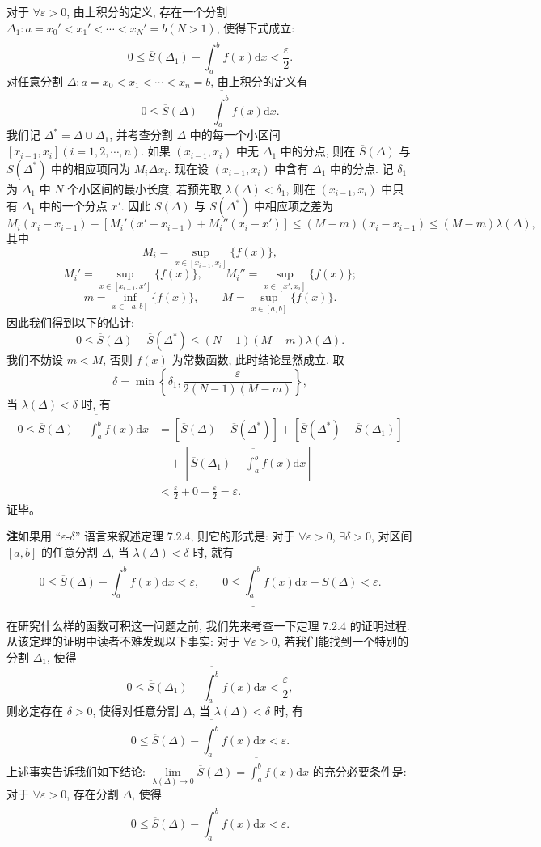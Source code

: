 \documentclass[UTF8, 12pt, fontset=fandol, oneside]{ctexart}
\begin{document}
对于 $\forall\varepsilon>0$, 由上积分的定义, 存在一个分割 $\Delta_1:a=x_0'<x_1'<\cdots<x_N'=b(N>1)$, 使得下式成立:
\[
  0\leq \overline S(\Delta_1)-\overline{\int_a^b} f(x)\mathrm dx<\frac{\varepsilon}{2}.
\]
对任意分割 $\Delta:a=x_0<x_1<\cdots<x_n=b$, 由上积分的定义有
\[
  0\leq \overline S(\Delta)-\overline{\int_a^b} f(x)\mathrm dx.
\]
我们记 $\Delta^*=\Delta\cup\Delta_1$, 并考查分割 $\Delta$ 中的每一个小区间 $[x_{i-1},x_i](i=1,2,\cdots,n)$. 如果 $(x_{i-1},x_i)$ 中无 $\Delta_1$ 中的分点, 则在 $\overline S(\Delta)$ 与 $\overline S(\Delta^*)$ 中的相应项同为 $M_i\Delta x_i$. 现在设 $(x_{i-1},x_i)$ 中含有 $\Delta_1$ 中的分点. 记 $\delta_1$ 为 $\Delta_1$ 中 $N$ 个小区间的最小长度, 若预先取 $\lambda(\Delta)<\delta_1$, 则在 $(x_{i-1},x_i)$ 中只有 $\Delta_1$ 中的一个分点 $x'$. 因此 $\overline S(\Delta)$ 与 $\overline S(\Delta^*)$ 中相应项之差为
\[
  M_i(x_i-x_{i-1})-[M_i'(x'-x_{i-1})+M_i''(x_i-x')]
  \leq (M-m)(x_i-x_{i-1})\leq (M-m)\lambda(\Delta),
\]
其中
\[
  M_i=\sup_{x\in[x_{i-1},x_i]}\{f(x)\},
\]
\[
  M_i'=\sup_{x\in[x_{i-1},x']}\{f(x)\},\qquad
  M_i''=\sup_{x\in[x',x_i]}\{f(x)\};
\]
\[
  m=\inf_{x\in[a,b]}\{f(x)\},\qquad M=\sup_{x\in[a,b]}\{f(x)\}.
\]
因此我们得到以下的估计:
\[
  0\leq \overline S(\Delta)-\overline S(\Delta^*)\leq (N-1)(M-m)\lambda(\Delta).
\]
我们不妨设 $m<M$, 否则 $f(x)$ 为常数函数, 此时结论显然成立. 取
\[
  \delta=\min\left\{\delta_1,\frac{\varepsilon}{2(N-1)(M-m)}\right\},
\]
当 $\lambda(\Delta)<\delta$ 时, 有
\[
\begin{aligned}
  0\leq \overline S(\Delta)-\overline{\int_a^b} f(x)\mathrm dx
  &=[\overline S(\Delta)-\overline S(\Delta^*)]+[\overline S(\Delta^*)-\overline S(\Delta_1)]\\
  &\quad+\left[\overline S(\Delta_1)-\overline{\int_a^b} f(x)\mathrm dx\right]\\
  &<\frac{\varepsilon}{2}+0+\frac{\varepsilon}{2}=\varepsilon.
\end{aligned}
\]
证毕。

\noindent\textbf{注}\quad 如果用 ``$\varepsilon$-$\delta$'' 语言来叙述定理 7.2.4, 则它的形式是: 对于 $\forall\varepsilon>0$, $\exists\delta>0$, 对区间 $[a,b]$ 的任意分割 $\Delta$, 当 $\lambda(\Delta)<\delta$ 时, 就有
\[
  0\leq \overline S(\Delta)-\overline{\int_a^b} f(x)\mathrm dx<\varepsilon,\qquad
  0\leq \underline{\int_a^b} f(x)\mathrm dx-\underline S(\Delta)<\varepsilon.
\]

在研究什么样的函数可积这一问题之前, 我们先来考查一下定理 7.2.4 的证明过程. 从该定理的证明中读者不难发现以下事实: 对于 $\forall\varepsilon>0$, 若我们能找到一个特别的分割 $\Delta_1$, 使得
\[
  0\leq \overline S(\Delta_1)-\overline{\int_a^b} f(x)\mathrm dx<\frac{\varepsilon}{2},
\]
则必定存在 $\delta>0$, 使得对任意分割 $\Delta$, 当 $\lambda(\Delta)<\delta$ 时, 有
\[
  0\leq \overline S(\Delta)-\overline{\int_a^b} f(x)\mathrm dx<\varepsilon.
\]
上述事实告诉我们如下结论: $\lim\limits_{\lambda(\Delta)\to0}\overline S(\Delta)=\overline{\int_a^b} f(x)\mathrm dx$ 的充分必要条件是: 对于 $\forall\varepsilon>0$, 存在分割 $\Delta$, 使得
\[
  0\leq \overline S(\Delta)-\overline{\int_a^b} f(x)\mathrm dx<\varepsilon.
\]
\end{document}
